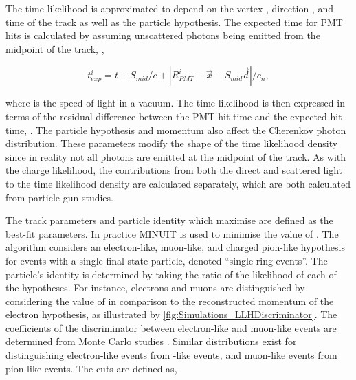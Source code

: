 The time likelihood is approximated to depend on the vertex , direction , and time  of the track as well as the particle hypothesis. The expected time for PMT hits is calculated by assuming unscattered photons being emitted from the midpoint of the track, ,

\begin{equation}
  t_{exp}^{i} = t + S_{mid}/c + |R_{PMT}^{i} - \vec{x} - S_{mid}\vec{d}|/c_{n},
\end{equation}

where  is the speed of light in a vacuum. The time likelihood is then expressed in terms of the residual difference between the PMT hit time and the expected hit time, .
The particle hypothesis and momentum also affect the Cherenkov photon distribution. These parameters modify the shape of the time likelihood density since in reality not all photons are emitted at the midpoint of the track. As with the charge likelihood, the contributions from both the direct and scattered light to the time likelihood density are calculated separately, which are both calculated from particle gun studies.

The track parameters and particle identity which maximise  are defined as the best-fit parameters. In practice MINUIT \cite{James:2296388} is used to minimise the value of . The \fq algorithm considers an electron-like, muon-like, and charged pion-like hypothesis for events with a single final state particle, denoted ``single-ring events''. The particle's identity is determined by taking the ratio of the likelihood of each of the hypotheses. For instance, electrons and muons are distinguished by considering the value of  in comparison to the reconstructed momentum of the electron hypothesis, as illustrated by \autoref{fig:Simulations_LLHDiscriminator}. The coefficients of the discriminator between electron-like and muon-like events are determined from Monte Carlo studies \cite{t2k_tn_146}. Similar distributions exist for distinguishing electron-like events from -like events, and muon-like events from pion-like events. The cuts are defined as,

